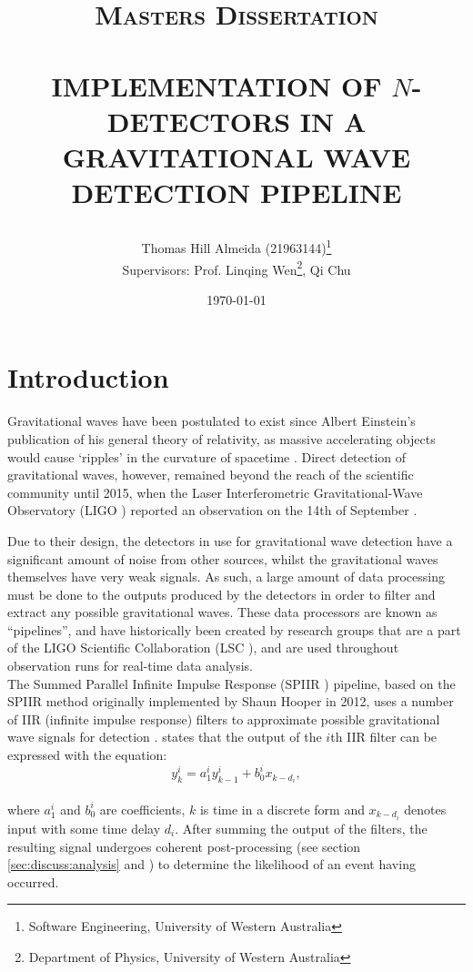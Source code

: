 \documentclass{article}
\title{\normalsize \textsc{Masters Dissertation}
        \\ [1.5cm]
        \HRule{0.5pt} \\
        \LARGE \textbf{\uppercase{Implementation of \(N\)-detectors in a gravitational wave detection pipeline}}
        \HRule{2pt} \\ [0.5cm]
        \normalsize \date{\today} \vspace*{2\baselineskip}}
\author{Thomas Hill Almeida (21963144)\thanks{Software Engineering, University of Western Australia}\\
\small{Supervisors: Prof. Linqing Wen\thanks{Department of Physics, University of Western Australia}, Qi Chu\footnotemark[2]}}
\date{}
\begin{document}
\maketitle{}
\newpage{}
\tableofcontents{}
\newpage{}

\begin{minipage}[t]{0.6\textwidth}
    \centering
    \section*{} \label{sec:abstract}
\end{minipage}

\section{Introduction} \label{sec:introduction}

Gravitational waves have been postulated to exist since Albert Einstein's publication of his general theory of relativity, as massive accelerating objects would cause `ripples' in the curvature of spacetime \cite{ligo_einstein}.
Direct detection of gravitational waves, however, remained beyond the reach of the scientific community until 2015, when the Laser Interferometric Gravitational-Wave Observatory (LIGO \cite[see][]{LIGO}) reported an observation on the 14th of September \cite{FirstDetectionPaper, DetectionWeb}.

Due to their design, the detectors in use for gravitational wave detection have a significant amount of noise from other sources, whilst the gravitational waves themselves have very weak signals.
As such, a large amount of data processing must be done to the outputs produced by the detectors in order to filter and extract any possible gravitational waves.
These data processors are known as ``pipelines'', and have historically been created by research groups that are a part of the LIGO Scientific Collaboration (LSC \cite[see][]{LSC}), and are used throughout observation runs for real-time data analysis.
\\

The Summed Parallel Infinite Impulse Response (SPIIR \cite[see][]{spiir}) pipeline, based on the SPIIR method originally implemented by Shaun Hooper in 2012, uses a number of IIR (infinite impulse response) filters to approximate possible gravitational wave signals for detection \cite{SPIIRCreate}.
\cite{SPIIRGPU2018} states that the output of the \(i\)th IIR filter can be expressed with the equation:
\begin{equation}
    y^i_k = a^i_1y^i_{k-1} + b^i_0x_{k-d_i},
\end{equation}
\\
where \(a^i_1\) and \(b^i_0\) are coefficients, \(k\) is time in a discrete form and \(x_{k-d_i}\) denotes input with some time delay \(d_i\).
After summing the output of the filters, the resulting signal undergoes coherent post-processing (see section \ref{sec:discuss:analysis} and \cite[chapter 4]{ChuThesis}) to determine the likelihood of an event having occurred.
\end{document}
